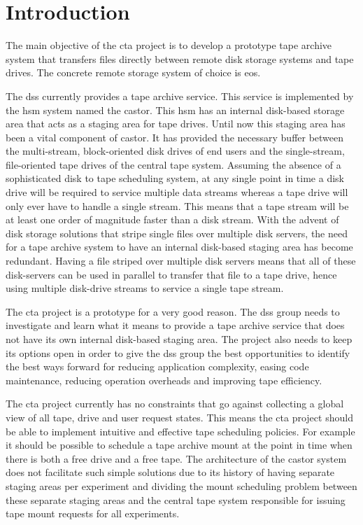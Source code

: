 \chapter{Introduction}

The main objective of the \gls{cta} project is to develop a prototype tape archive system that transfers files directly
between remote disk storage systems and tape drives. The concrete remote storage system of choice is \gls{eos}.

The \gls{dss} currently provides a tape archive service. This service is implemented by the \gls{hsm} system
named the \gls{castor}. This \gls*{hsm} has an internal disk-based storage area that acts as a staging area for
tape drives. Until now this staging area has been a vital component of \gls*{castor}. It has provided the necessary
buffer between the multi-stream, block-oriented disk drives of end users and the single-stream, file-oriented tape
drives of the central tape system.  Assuming the absence of a sophisticated disk to tape scheduling system, at any
single point in time a disk drive will be required to service multiple data streams whereas a tape drive will only
ever have to handle a single stream. This means that a tape stream will be at least one order of magnitude faster
than a disk stream. With the advent of disk storage solutions that stripe single files over multiple disk servers,
the need for a tape archive system to have an internal disk-based staging area has become redundant. Having a file
striped over multiple disk servers means that all of these disk-servers can be used in parallel to transfer that
file to a tape drive, hence using multiple disk-drive streams to service a single tape stream.

The \gls*{cta} project is a prototype for a very good reason. The \gls*{dss} group needs to investigate and learn
what it means to provide a tape archive service that does not have its own internal disk-based staging area. The
project also needs to keep its options open in order to give the \gls*{dss} group the best opportunities to identify
the best ways forward for reducing application complexity, easing code maintenance, reducing operation overheads
and improving tape efficiency.

The \gls*{cta} project currently has no constraints that go against collecting a global view of all tape, drive and
user request states. This means the \gls*{cta} project should be able to implement intuitive and effective tape
scheduling policies.  For example it should be possible to schedule a tape archive mount at the point in time
when there is both a free drive and a free tape. The architecture of the \gls*{castor} system does not facilitate
such simple solutions due to its history of having separate staging areas per experiment and dividing the mount
scheduling problem between these separate staging areas and the central tape system responsible for issuing tape
mount requests for all experiments.

